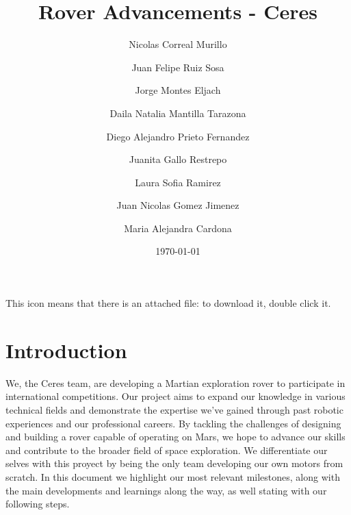 \documentclass{article}
\title{Rover Advancements - Ceres}
\author{Nicolas Correal Murillo \and Juan Felipe Ruiz Sosa \and Jorge Montes Eljach \and Daila Natalia Mantilla Tarazona \and Diego Alejandro Prieto Fernandez \and Juanita Gallo Restrepo \and Laura Sofia Ramirez \and Juan Nicolas Gomez Jimenez \and Maria Alejandra Cardona }
\date{\today}
\begin{document}
\maketitle
\newpage

\tableofcontents

\newpage

This icon means that there is an attached file: \noattachfile{} to download it, double click it.
\section{Introduction}
We, the Ceres team, are developing a Martian exploration rover to participate in international competitions.
Our project aims to expand our knowledge in various technical fields and demonstrate the expertise we've gained
 through past robotic experiences and our professional careers. By tackling the challenges of designing and 
 building a rover capable of operating on Mars, we hope to advance our skills and contribute to the broader 
 field of space exploration. We differentiate our selves with this proyect by being the only team developing our own motors from scratch.
In this document we highlight our most relevant milestones, along with the main developments and learnings along the way, as well stating with our following steps.
\end{document}
